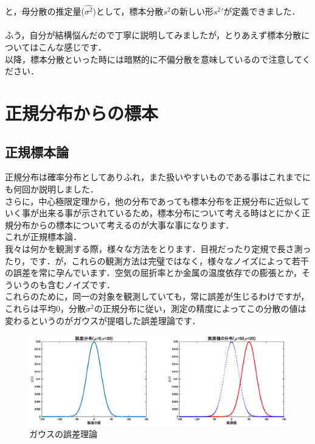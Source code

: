 \documentclass[11pt,a4paper]{ujreport} 	%
\begin{document}
と，母分散の推定量($\hat{\sigma^2}$)として，標本分散$s^2$の新しい形$s^2\prime$が定義できました．\\
\\

ふう，自分が結構悩んだので丁寧に説明してみましたが，とりあえず標本分散についてはこんな感じです．\\

以降，標本分散といった時には暗黙的に不偏分散を意味しているので注意してください．

\section{正規分布からの標本}

\subsection{正規標本論}
正規分布は確率分布としてありふれ，また扱いやすいものである事はこれまでにも何回か説明しました．\\

さらに，中心極限定理から，他の分布であっても標本分布を正規分布に近似していく事が出来る事が示されているため，標本分布について考える時はとにかく正規分布からの標本について考えるのが大事な事になります．\\

これが正規標本論．\\

我々は何かを観測する際，様々な方法をとります．目視だったり定規で長さ測ったり，です．が，これらの観測方法は完璧ではなく，様々なノイズによって若干の誤差を常に孕んでいます．空気の屈折率とか金属の温度依存での膨張とか，そういうのも含むノイズです．\\

これらのために，同一の対象を観測していても，常に誤差が生じるわけですが，これらは平均0，分散$\sigma^2$の正規分布に従い，測定の精度によってこの分散の値は変わるというのがガウスが提唱した誤差理論です．\\

\begin{figure}[H]
  \centering
  \includegraphics[width=15cm]{../figures/gauss-error.eps}
  \caption{ガウスの誤差理論}
\end{figure}
\end{document}
